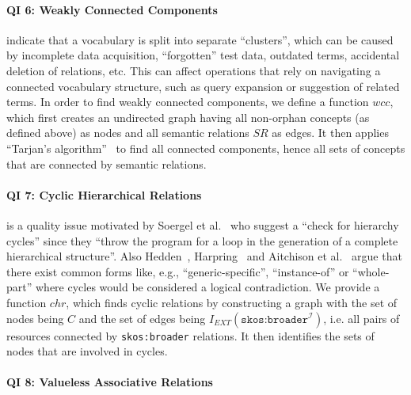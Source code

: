 \paragraph{QI 6: Weakly Connected Components}

indicate that a vocabulary is split into separate ``clusters'', which can be caused by incomplete data acquisition, ``forgotten'' test data, outdated terms, accidental deletion of relations, etc. This can affect operations that rely on navigating a connected vocabulary structure, such as query expansion or suggestion of related terms.
In order to find weakly connected components, we define a function $wcc$, which first creates an undirected graph having all non-orphan concepts (as defined above) as nodes and all semantic relations $SR$ as edges. It then applies ``Tarjan’s algorithm''~\cite{Hopcroft1973} to find all connected components, hence all sets of concepts that are connected by semantic relations.

\paragraph{QI 7: Cyclic Hierarchical Relations}

is a quality issue motivated by Soergel et al.~\cite{Soergel2002} who suggest a ``check for hierarchy cycles'' since they ``throw the program for a loop in the generation of a complete hierarchical structure''. Also Hedden~\cite{Hedden2010}, Harpring~\cite{Harpring2010} and Aitchison et al.~\cite{Aitchison2000} argue that there exist common forms like, e.g., ``generic-specific'', ``instance-of'' or ``whole-part'' where cycles would be considered a logical contradiction.
We provide a function $chr$, which finds cyclic relations by constructing a graph with the set of nodes being $C$ and the set of edges being $I_{EXT}(\texttt{skos:broader}^\mathcal{I})$, i.e. all pairs of resources connected by \texttt{skos:broader} relations. It then identifies the sets of nodes that are involved in cycles. 


\paragraph{QI 8: Valueless Associative Relations}

